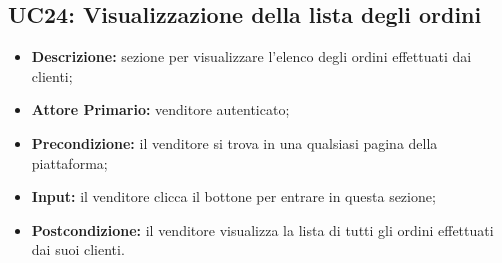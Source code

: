 \subsection{UC24: Visualizzazione della lista degli ordini}
\label{sec:UC24}
\begin{itemize}
    \item \textbf{Descrizione:} sezione per visualizzare l'elenco degli ordini effettuati dai clienti;
    \item \textbf{Attore Primario:} venditore autenticato; 
    \item \textbf{Precondizione:} il venditore si trova in una qualsiasi pagina della piattaforma;
    \item \textbf{Input:} il venditore clicca il bottone per entrare in questa sezione; 
    \item \textbf{Postcondizione:} il venditore visualizza la lista di tutti gli ordini effettuati dai suoi clienti.
\end{itemize}

